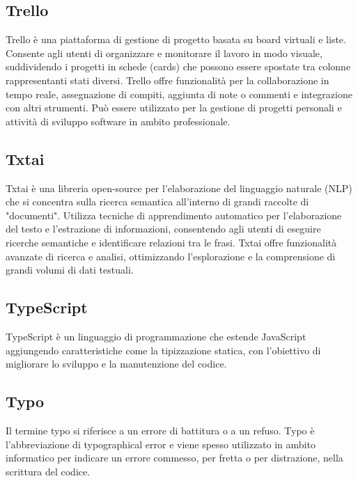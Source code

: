 \vspace{2em}
\subsection*{Trello}
\par Trello è una piattaforma di gestione di progetto basata su board virtuali e liste. Consente agli utenti di organizzare e monitorare il lavoro in modo visuale, suddividendo i progetti in schede (cards) che possono essere spostate tra colonne rappresentanti stati diversi. Trello offre funzionalità per la collaborazione in tempo reale, assegnazione di compiti, aggiunta di note o commenti e integrazione con altri strumenti. Può essere utilizzato per la gestione di progetti personali e attività di sviluppo software in ambito professionale.

\vspace{2em}
\subsection*{Txtai}
\par Txtai è una libreria open-source per l'elaborazione del linguaggio naturale (NLP) che si concentra sulla ricerca semantica all'interno di grandi raccolte di "documenti". Utilizza tecniche di apprendimento automatico per l'elaborazione del testo e l'estrazione di informazioni, consentendo agli utenti di eseguire ricerche semantiche e identificare relazioni tra le frasi. Txtai offre funzionalità avanzate di ricerca e analisi, ottimizzando l'esplorazione e la comprensione di grandi volumi di dati testuali.

\vspace{2em}
\subsection*{TypeScript}
\par TypeScript è un linguaggio di programmazione che estende JavaScript aggiungendo caratteristiche come la tipizzazione statica, con l'obiettivo di migliorare lo sviluppo e la manutenzione del codice.

\vspace{2em}
\subsection*{Typo}
\par Il termine typo si riferisce a un errore di battitura o a un refuso. Typo è l'abbreviazione di typographical error e viene spesso utilizzato in ambito informatico per indicare un errore commesso, per fretta o per distrazione, nella scrittura del codice.
